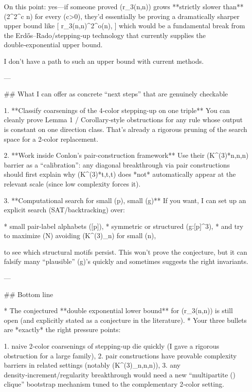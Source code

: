 On this point: yes—if someone proved (r_3(n,n)) grows **strictly slower than** (2^{2^{c n}}) for every (c>0), they’d essentially be proving a dramatically sharper upper bound like
[
r_3(n,n)^{2^{o(n)}},
]
which would be a fundamental break from the Erdős–Rado/stepping‑up technology that currently supplies the double‑exponential upper bound. 

I don’t have a path to such an upper bound with current methods.

---

## What I can offer as concrete “next steps” that are genuinely checkable

1. **Classify coarsenings of the 4‑color stepping-up on one triple**
You can cleanly prove Lemma 1 / Corollary‑style obstructions for any rule whose output is constant on one direction class. That’s already a rigorous pruning of the search space for a 2‑color replacement.

2. **Work inside Conlon’s pair-construction framework**
Use their (K^{(3)}*{n,n,n}) barrier as a “calibration”: any diagonal breakthrough via pair constructions should first explain why (K^{(3)}*{t,t,t}) does *not* automatically appear at the relevant scale (since low complexity forces it). 

3. **Computational search for small (p), small (g)**
If you want, I can set up an explicit search (SAT/backtracking) over:

* small pair-label alphabets ([p]),
* symmetric or structured (g:[p]^3),
* and try to maximize (N) avoiding (K^{(3)}_n) for small (n),

to see which structural motifs persist. This won’t prove the conjecture, but it can falsify many “plausible” (g)’s quickly and sometimes suggests the right invariants.

---

## Bottom line

* The conjectured **double exponential lower bound** for (r_3(n,n)) is still open (and explicitly stated as a conjecture in the literature). 
* Your three bullets are *exactly* the right pressure points:

1. naive 2‑color coarsenings of stepping‑up die quickly (I gave a rigorous obstruction for a large family),
2. pair constructions have provable complexity barriers in related settings (notably (K^{(3)}_{n,n,n})), 
3. any density‑increment/regularity breakthrough would need a new “multipartite (\Rightarrow) clique” bootstrap mechanism tuned to the complementary 2‑color setting.

